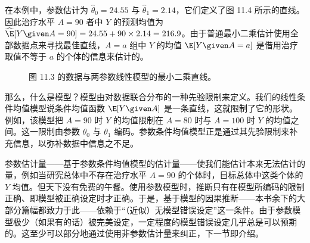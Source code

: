 
在本例中，参数估计为 $\hat\theta_0=24.55$ 与 $\hat\theta_1=2.14$，它们定义了图 11.4 所示的直线。因此治疗水平 $A=90$ 者中 $Y$ 的预测均值为 $\widehat{\E}[Y\given A=90]=24.55+90\times2.14=216.9$。由于普通最小二乘估计使用全部数据点来寻找最佳直线，$A=a$ 组中 $Y$ 的均值 $\E[Y\given A=a]$ 是借用治疗取值不等于 $a$ 的个体的信息来估计的。

\begin{figure}[htbp]
\centering
{}
\caption{图 11.3 的数据与两参数线性模型的最小二乘直线。}
\label{fig:11.4}
\end{figure}

那么，什么是模型？模型由对数据联合分布的一种先验限制来定义。我们的线性条件均值模型说条件均值函数 $\E[Y\given A]$ 是一条直线，这就限制了它的形状。例如，该模型把 $A=90$ 时 $Y$ 的均值限制在 $A=80$ 时与 $A=100$ 时 $Y$ 的均值之间。这一限制由参数 $\theta_0$ 与 $\theta_1$ 编码。参数条件均值模型正是通过其先验限制来补充信息，以弥补数据中信息之不足。

参数估计量——基于参数条件均值模型的估计量——使我们能估计本来无法估计的量，例如当研究总体中不存在治疗水平 $A=90$ 的个体时，目标总体中这类个体的 $Y$ 均值。但天下没有免费的午餐。使用参数模型时，推断只有在模型所编码的限制正确、即模型被正确设定时才正确。于是，基于模型的因果推断——本书余下的大部分篇幅都致力于此——依赖于“（近似）无模型错误设定”这一条件。由于参数模型极少（如果有的话）被完美设定，一定程度的模型错误设定几乎总是可以预期的。这至少可以部分地通过使用非参数估计量来纠正，下一节即介绍。

